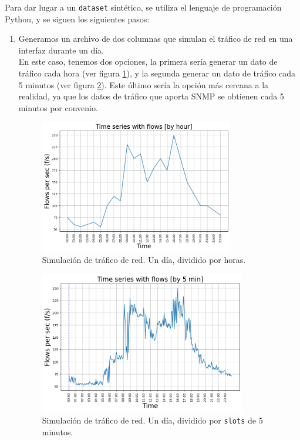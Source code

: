 \documentclass[a4paper, oneside, 12pt]{book}
\begin{document}
	\noindent Para dar lugar a un \texttt{dataset} sintético, se utiliza el lenguaje de programación Python, y se siguen los siguientes pasos: 
	
	\begin{enumerate}
		\item Generamos un archivo de dos columnas que simulan el tráfico de red en una interfaz durante un día. \\
		
		En este caso, tenemos dos opciones, la primera sería generar un dato de tráfico cada hora (ver figura \ref{img: anexo 1}), y la segunda generar un dato de tráfico cada 5 minutos (ver figura \ref{img: anexo 2}). Este último sería la opción más cercana a la realidad, ya que los datos de tráfico que aporta SNMP se obtienen cada 5 minutos por convenio.
		
		\begin{figure}[h!]
			\includegraphics[width=0.8\textwidth, center]{img/anexo_1.png}
			\caption{Simulación de tráfico de red. Un día, dividido por horas.}
			\label{img: anexo 1}
		\end{figure}
	
		\pagebreak
		
		\begin{figure}[h!]
			\includegraphics[width=0.85\textwidth, center]{img/anexo_2.png}
			\caption{Simulación de tráfico de red. Un día, dividido por \texttt{slots} de 5 minutos.}
			\label{img: anexo 2}
		\end{figure}
	

\end{enumerate}
\end{document}
